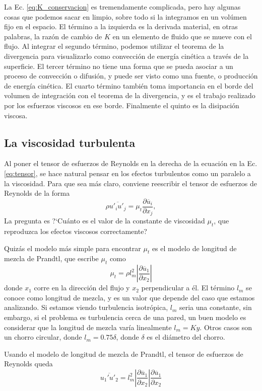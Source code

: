 La Ec. \eqref{eq:K_conservacion} es tremendamente complicada, pero hay algunas cosas que podemos sacar en limpio, sobre todo si la integramos en un volúmen fijo en el espacio.
El término a la izquierda es la derivada material, en otras palabras, la razón de cambio de $K$ en un elemento de fluido que se mueve con el flujo.
Al integrar el segundo término, podemos utilizar el teorema de la divergencia para visualizarlo como convección de energía cinética a través de la superficie.
El tercer término no tiene una forma que se pueda asociar a un proceso de convección o difusión, y puede ser visto como una fuente, o producción de energía cinética.
El cuarto término también toma importancia en el borde del volumen de integración con el teorema de la divergencia, y es el trabajo realizado por los esfuerzos viscosos en ese borde.
Finalmente el quinto es la disipación viscosa.


\subsection*{La viscosidad turbulenta}
Al poner el tensor de esfuerzos de Reynolds en la derecha de la ecuación en la Ec. \eqref{eq:tensor}, se hace natural pensar en los efectos turbulentos como un paralelo a la viscosidad.
Para que sea más claro, conviene reescribir el tensor de esfuerzos de Reynolds de la forma
%
\begin{equation}
\rho\overline{u'_iu'_j}=\mu_t\frac{\partial \overline{u}_i}{\partial x_j}, 
\end{equation}
%
La pregunta es \mbox{?`}Cuánto es el valor de la constante de viscosidad $\mu_t$, que reproduzca los efectos viscosos correctamente?

Quizás el modelo más simple para encontrar $\mu_t$ es el modelo de longitud de mezcla de Prandtl, que escribe $\mu_t$ como
%
\begin{equation}
\mu_t = \rho l_m^2\left|\frac{\partial \overline{u}_1}{\partial x_2}\right|
\end{equation}
%
donde $x_1$ corre en la dirección del flujo y $x_2$ perpendicular a él.
El término $l_m$ se conoce como longitud de mezcla, y es un valor que depende del caso que estamos analizando.
Si estamos viendo turbulencia isotrópica, $l_m$ seria una constante, sin embargo, si el problema es turbulencia cerca de una pared, un buen modelo es considerar que la longitud de mezcla varía linealmente $l_m=Ky$.
Otros casos son un chorro circular, donde $l_m = 0.75\delta$, donde $\delta$ es el diámetro del chorro.

Usando el modelo de longitud de mezcla de Prandtl, el tensor de esfuerzos de Reynolds queda
%
\begin{equation}
\overline{u_1'u'_2} = l_m^2\left|\frac{\partial \overline{u}_1}{\partial x_2}\right|\frac{\partial \overline{u}_1}{\partial x_2}
\end{equation}

